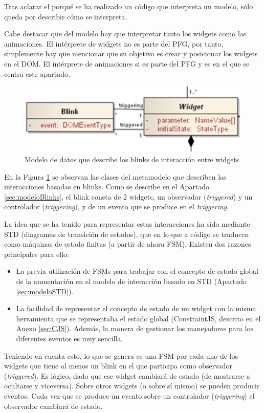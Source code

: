 Tras aclarar el porqué se ha realizado un código que interpreta un modelo, sólo queda por describir cómo se interpreta.

Cabe destacar que del modelo hay que interpretar tanto los widgets como las animaciones. El intérprete de widgets no es parte del PFG, por tanto, simplemente hay que mencionar que su objetivo es crear y posicionar los widgets en el DOM. El intérprete de animaciones si es parte del PFG y es en el que se centra este apartado.

\begin{figure}
\centering
\includegraphics[width=0.7\linewidth]{./figs/5-MetamodelReducedWidgetsBlinks}
\caption{Modelo de datos que describe los blinks de interacción entre widgets}
\label{fig:MetamodelReducedWidgetsBlinks}
\end{figure}

En la Figura \ref{fig:MetamodelReducedWidgetsBlinks} se observan las clases del metamodelo que describen las interacciones basadas en blinks. Como se describe en el Apartado \ref{sec:modeloBlinks}, el blink consta de 2 widgets, un observador (\emph{triggered}) y un controlador (\emph{triggering}), y de un evento que se produce en el \emph{triggering}.

La idea que se ha tenido para representar estas interacciones ha sido mediante STD (diagramas de transición de estados), que en lo que a código se traducen como máquinas de estado finitas (a partir de ahora FSM). Existen dos razones principales para ello:
\begin{itemize}
\item{La previa utilización de FSMs para trabajar con el concepto de estado global de la aumentación en el modelo de interacción basado en STD (Apartado \ref{sec:modeloSTD}).}
\item{La facilidad de representar el concepto de estado de un widget con la misma herramienta que se representaba el estado global (ConstraintJS, descrito en el Anexo \ref{sec:CJS}). Además, la manera de gestionar los manejadores para los diferentes eventos es muy sencilla.}
\end{itemize}

Teniendo en cuenta esto, lo que se genera es una FSM por cada uno de los widgets que tiene al menos un blink en el que participa como observador (\emph{triggered}). Es lógico, dado que ese widget cambiará de estado (de mostrarse a ocultarse y viceversa). Sobre otros widgets (o sobre sí mismo) se pueden producir eventos. Cada vez que se produce un evento sobre un controlador (\emph{triggering}) el observador cambiará de estado. 

